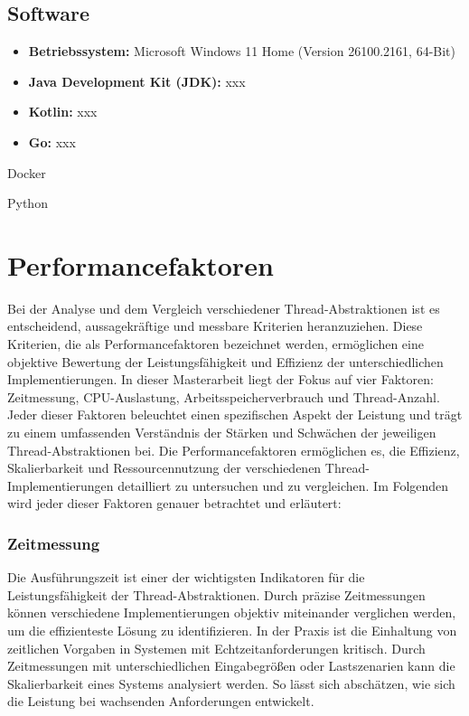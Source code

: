 \documentclass[fontsize=12pt,paper=a4,twoside=semi,parskip=half-,headsepline,headinclude]{scrreprt}
\begin{document}
\subsection{Software}

\begin{itemize}
	\item \textbf{Betriebssystem:} Microsoft Windows 11 Home (Version 26100.2161, 64-Bit)
	\item \textbf{Java Development Kit (JDK):} xxx
	\item \textbf{Kotlin:} xxx
	\item \textbf{Go:} xxx
\end{itemize}

Docker

Python


\section{Performancefaktoren}

Bei der Analyse und dem Vergleich verschiedener Thread-Abstraktionen ist es entscheidend, aussagekräftige und messbare Kriterien heranzuziehen. Diese Kriterien, die als Performancefaktoren bezeichnet werden, ermöglichen eine objektive Bewertung der Leistungsfähigkeit und Effizienz der unterschiedlichen Implementierungen. In dieser Masterarbeit liegt der Fokus auf vier Faktoren: Zeitmessung, CPU-Auslastung, Arbeitsspeicherverbrauch und Thread-Anzahl. Jeder dieser Faktoren beleuchtet einen spezifischen Aspekt der Leistung und trägt zu einem umfassenden Verständnis der Stärken und Schwächen der jeweiligen Thread-Abstraktionen bei. Die Performancefaktoren ermöglichen es, die Effizienz, Skalierbarkeit und Ressourcennutzung der verschiedenen Thread-\-Imple\-mentie\-rungen detailliert zu untersuchen und zu vergleichen. Im Folgenden wird jeder dieser Faktoren genauer betrachtet und erläutert:

\subsubsection{Zeitmessung}

Die Ausführungszeit ist einer der wichtigsten Indikatoren für die Leistungsfähigkeit der Thread-Abstraktionen. Durch präzise Zeitmessungen können verschiedene Implementierungen objektiv miteinander verglichen werden, um die effizienteste Lösung zu identifizieren. In der Praxis ist die Einhaltung von zeitlichen Vorgaben in Systemen mit Echtzeitanforderungen kritisch. Durch Zeitmessungen mit unterschiedlichen Eingabegrößen oder Lastszenarien kann die Skalierbarkeit eines Systems analysiert werden. So lässt sich abschätzen, wie sich die Leistung bei wachsenden Anforderungen entwickelt.
\end{document}
